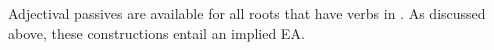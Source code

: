 Adjectival passives are available for all roots that have verbs in \thif. As discussed above, these constructions entail an implied EA.






